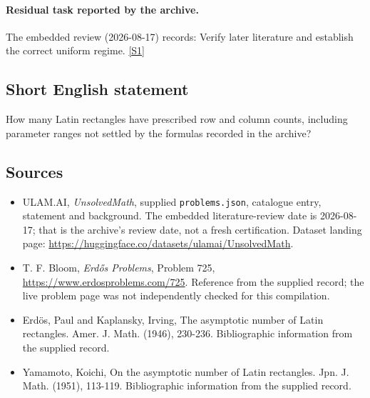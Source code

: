 \documentclass[11pt,a4paper]{article}
\newcommand{\sref}[2]{\hyperlink{source:#1:#2}{[S#2]}}
\begin{document}
\paragraph{Residual task reported by the archive.}

The embedded review (2026-08-17) records: Verify later literature and establish the correct uniform regime. \sref{statement}{1}

\subsection{Short English statement}

How many Latin rectangles have prescribed row and column counts, including parameter ranges not settled by the formulas recorded in the archive?

\subsection{Sources}

{\small

\begin{itemize}

\item[\hypertarget{source:statement:1}{S1}] ULAM.AI, \emph{UnsolvedMath}, supplied \texttt{problems.json}, catalogue entry, statement and background. The embedded literature-review date is 2026-08-17; that is the archive’s review date, not a fresh certification. Dataset landing page: \url{https://huggingface.co/datasets/ulamai/UnsolvedMath}.

\item[\hypertarget{source:statement:2}{S2}] T. F. Bloom, \emph{Erdős Problems}, Problem 725, \url{https://www.erdosproblems.com/725}. Reference from the supplied record; the live problem page was not independently checked for this compilation.

\item[\hypertarget{source:statement:3}{S3}] Erd\"{o}s, Paul and Kaplansky, Irving, The asymptotic number of Latin rectangles. Amer. J. Math. (1946), 230-236. Bibliographic information from the supplied record.

\item[\hypertarget{source:statement:4}{S4}] Yamamoto, Koichi, On the asymptotic number of Latin rectangles. Jpn. J. Math. (1951), 113-119. Bibliographic information from the supplied record.

\end{itemize}

}

\label{end:statement}
\end{document}
